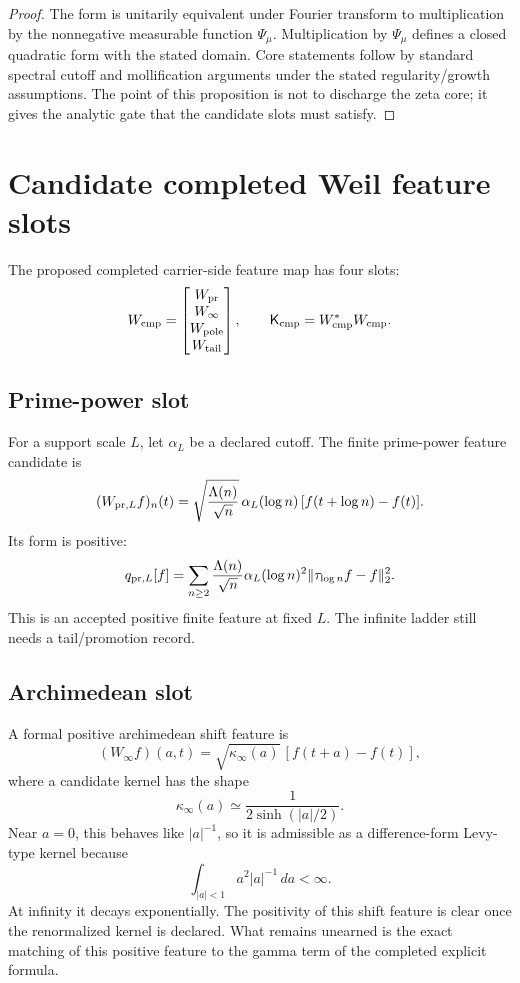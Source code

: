 \documentclass[11pt]{article}
\newcommand{\Kcmp}{\mathsf K_{\rm cmp}}
\newcommand{\Wcmp}{W_{\rm cmp}}
\begin{document}
\begin{proof}
The form is unitarily equivalent under Fourier transform to multiplication by the nonnegative measurable function \(\Psi_\mu\).  Multiplication by \(\Psi_\mu\) defines a closed quadratic form with the stated domain.  Core statements follow by standard spectral cutoff and mollification arguments under the stated regularity/growth assumptions.  The point of this proposition is not to discharge the zeta core; it gives the analytic gate that the candidate slots must satisfy.
\end{proof}

\section{Candidate completed Weil feature slots}
The proposed completed carrier-side feature map has four slots:
\[
  \Wcmp=
  \begin{bmatrix}
  W_{\rm pr}\\ W_\infty\\ W_{\rm pole}\\ W_{\rm tail}
  \end{bmatrix},
  \qquad
  \Kcmp=\Wcmp^*\Wcmp.
\]

\subsection{Prime-power slot}
For a support scale \(L\), let \(\alpha_L\) be a declared cutoff.  The finite prime-power feature candidate is
\[
  (W_{{\rm pr},L}f)_n(t)=
  \sqrt{\frac{\Lambda(n)}{\sqrt n}}\,\alpha_L(\log n)\,[f(t+\log n)-f(t)].
\]
Its form is positive:
\[
  q_{{\rm pr},L}[f]
  =\sum_{n\ge2}\frac{\Lambda(n)}{\sqrt n}\alpha_L(\log n)^2
  \|\tau_{\log n}f-f\|_2^2.
\]
This is an accepted positive finite feature at fixed \(L\).  The infinite ladder still needs a tail/promotion record.

\subsection{Archimedean slot}
A formal positive archimedean shift feature is
\[
  (W_\infty f)(a,t)=\sqrt{\kappa_\infty(a)}\,[f(t+a)-f(t)],
\]
where a candidate kernel has the shape
\[
  \kappa_\infty(a)\simeq \frac{1}{2\sinh(|a|/2)}.
\]
Near \(a=0\), this behaves like \(|a|^{-1}\), so it is admissible as a difference-form Levy-type kernel because
\[
  \int_{|a|<1} a^2|a|^{-1}\,da<\infty.
\]
At infinity it decays exponentially.  The positivity of this shift feature is clear once the renormalized kernel is declared.  What remains unearned is the exact matching of this positive feature to the gamma term of the completed explicit formula.
\end{document}

